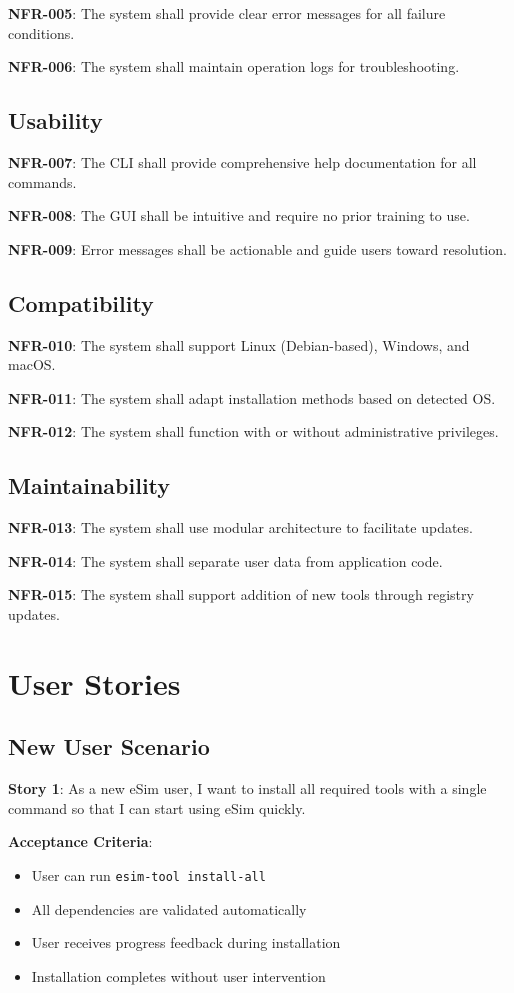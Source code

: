 \documentclass[12pt,a4paper]{report}
\begin{document}
\textbf{NFR-005}: The system shall provide clear error messages for all failure conditions.

\textbf{NFR-006}: The system shall maintain operation logs for troubleshooting.

\subsection{Usability}
\textbf{NFR-007}: The CLI shall provide comprehensive help documentation for all commands.

\textbf{NFR-008}: The GUI shall be intuitive and require no prior training to use.

\textbf{NFR-009}: Error messages shall be actionable and guide users toward resolution.

\subsection{Compatibility}
\textbf{NFR-010}: The system shall support Linux (Debian-based), Windows, and macOS.

\textbf{NFR-011}: The system shall adapt installation methods based on detected OS.

\textbf{NFR-012}: The system shall function with or without administrative privileges.

\subsection{Maintainability}
\textbf{NFR-013}: The system shall use modular architecture to facilitate updates.

\textbf{NFR-014}: The system shall separate user data from application code.

\textbf{NFR-015}: The system shall support addition of new tools through registry updates.

\section{User Stories}
\subsection{New User Scenario}
\textbf{Story 1}: As a new eSim user, I want to install all required tools with a single command so that I can start using eSim quickly.

\textbf{Acceptance Criteria}:
\begin{itemize}
    \item User can run \texttt{esim-tool install-all}
    \item All dependencies are validated automatically
    \item User receives progress feedback during installation
    \item Installation completes without user intervention
\end{itemize}
\end{document}
